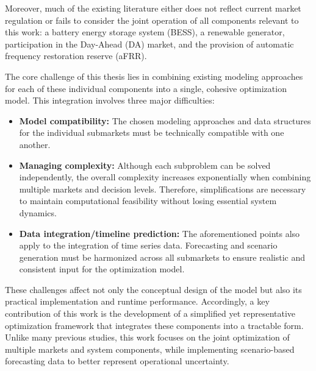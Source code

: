 Moreover, much of the existing literature either does not reflect current market regulation
or fails to consider the joint operation of all components relevant to this work:
a battery energy storage system (BESS), a renewable generator, participation in the Day-Ahead (DA) market,
and the provision of automatic frequency restoration reserve (aFRR).

The core challenge of this thesis lies in combining existing modeling approaches
for each of these individual components into a single, cohesive optimization model.
This integration involves three major difficulties:

\begin{itemize}
	\item \textbf{Model compatibility:} The chosen modeling approaches and data structures
	      for the individual submarkets must be technically compatible with one another.

	\item \textbf{Managing complexity:} Although each subproblem can be solved independently,
	      the overall complexity increases exponentially when combining multiple markets and decision levels.
	      Therefore, simplifications are necessary to maintain computational feasibility
	      without losing essential system dynamics.

	\item \textbf{Data integration/timeline prediction:} The aforementioned points also apply to the integration
	      of time series data. Forecasting and scenario generation must be harmonized across all submarkets
	      to ensure realistic and consistent input for the optimization model.
\end{itemize}

These challenges affect not only the conceptual design of the model but also its practical implementation and runtime performance.
Accordingly, a key contribution of this work is the development of a simplified yet representative optimization framework
that integrates these components into a tractable form.
Unlike many previous studies, this work focuses on the joint optimization of multiple markets and system components,
while implementing scenario-based forecasting data to better represent operational uncertainty.\\

